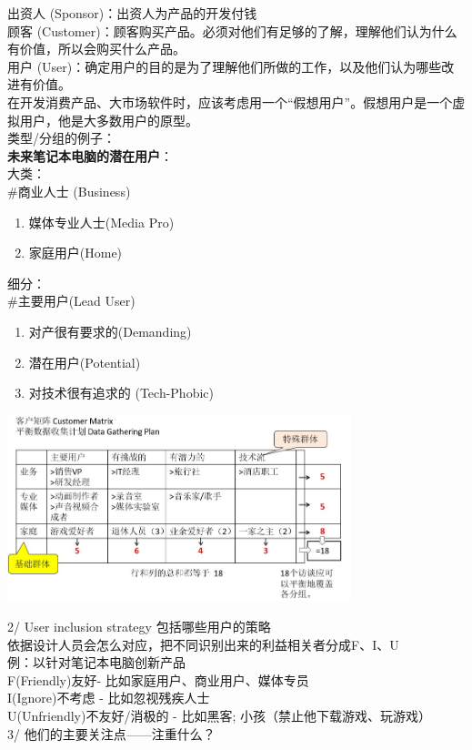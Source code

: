 出资人 (Sponsor)：出资人为产品的开发付钱\\
顾客
(Customer)：顾客购买产品。必须对他们有足够的了解，理解他们认为什么有价值，所以会购买什么产品。\\
用户
(User)：确定用户的目的是为了理解他们所做的工作，以及他们认为哪些改进有价值。\\
在开发消费产品、大市场软件时，应该考虑用一个``假想用户''。假想用户是一个虚拟用户，他是大多数用户的原型。\\
类型/分组的例子：\\
\textbf{未来笔记本电脑的潜在用户}：\\
大类：\\
\#商业人士 (Business)

\begin{enumerate}
\tightlist
\item
  媒体专业人士(Media Pro)
\item
  家庭用户(Home)
\end{enumerate}

细分：\\
\#主要用户(Lead User)

\begin{enumerate}
\tightlist
\item
  对产很有要求的(Demanding)
\item
  潜在用户(Potential)
\item
  对技术很有追求的 (Tech-Phobic)
\end{enumerate}


\includegraphics[width=10cm]{CustomerMatrixScreenshot_2022-12-16_180326.jpg}

2/ User inclusion strategy 包括哪些用户的策略\\
依据设计人员会怎么对应，把不同识别出来的利益相关者分成F、I、U\\
例：以针对笔记本电脑创新产品\\
F(Friendly)友好- 比如家庭用户、商业用户、媒体专员\\
I(Ignore)不考虑 - 比如忽视残疾人士\\
U(Unfriendly)不友好/消极的 - 比如黑客; 小孩（禁止他下载游戏、玩游戏）\\
3/ 他们的主要关注点------注重什么？

